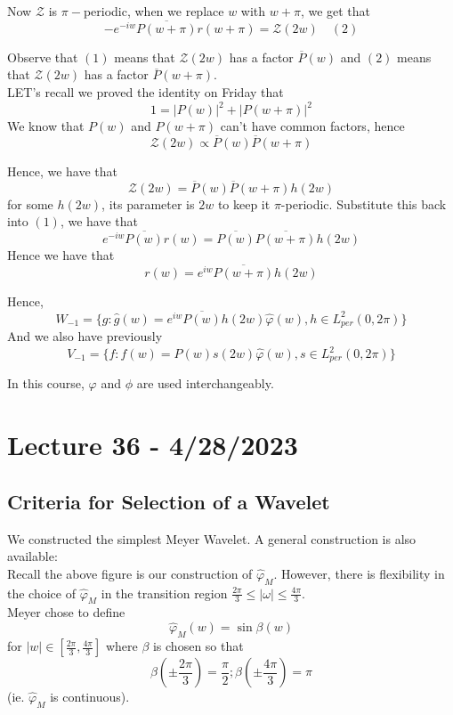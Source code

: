 \documentclass{article}
\begin{document}
{Now $\mathcal{Z}$ is $\pi-$periodic, when we replace $w$ with $w + \pi$, we get that
\[- e^{-iw} \overline{P(w + \pi)} r(w + \pi) = \mathcal{Z}(2w)\quad (2)\]

Observe that $(1)$ means that $\mathcal{Z}(2w)$ has a factor $\overline{P}(w)$ and $(2)$ means that $\mathcal{Z}(2w)$ has a factor $\overline{P}(w + \pi)$.\\

LET's recall we proved the identity on Friday that
\[1 = |P(w)|^2 + |P(w + \pi)|^2\]
We know that $P(w)$ and $P(w + \pi)$ can't have common factors, hence
\[\mathcal{Z}(2w) \propto \overline{P}(w) \overline{P}(w + \pi)\]

Hence, we have that
\[\mathcal{Z}(2w) = \overline{P}(w) \overline{P}(w + \pi) h(2w)\]
for some $h(2w)$, its parameter is $2w$ to keep it $\pi$-periodic. Substitute this back into $(1)$, we have that
\[e^{-iw} \overline{P(w)} r(w) = \overline{P(w)}  \overline{P(w+\pi)} h(2w)\]
Hence we have that
\[r(w) = e^{iw} \overline{P(w + \pi)} h(2w)\]

Hence,
\[W_{-1} = \{g: \widehat{g}(w) = e^{iw} \overline{P(w)} h(2w) \widehat{\varphi}(w), h \in L^2_{per}(0, 2\pi) \}\]
And we also have previously
\[V_{-1} = \{f: \widehat{f}(w) = P(w) s(2w) \widehat{\varphi}(w), s \in L^2_{per}(0, 2\pi)\}\]

\begin{remark}
    In this course, $\varphi$ and $\phi$ are used interchangeably.
\end{remark}

\newpage
\section{Lecture 36 - 4/28/2023}

\subsection{Criteria for Selection of a Wavelet}

We constructed the simplest Meyer Wavelet. A general construction is also available:
\[\]
Recall the above figure is our construction of $\widehat{\varphi}_M$. However, there is flexibility in the choice of $\widehat{\varphi}_M$ in the transition region $\frac{2\pi}{3} \leq |\omega| \leq \frac{4\pi}{3}$.\\

Meyer chose to define
\[\widehat{\varphi}_M(w) = \sin \beta(w)\]
for $|w| \in [\frac{2\pi}{3}, \frac{4\pi}{3}]$ where $\beta$ is chosen so that
\[\beta(\pm \frac{2\pi}{3}) = \frac{\pi}{2}; \beta(\pm \frac{4\pi}{3}) = \pi\]
(ie. $\widehat{\varphi}_M$ is continuous).\\

}
\end{document}
